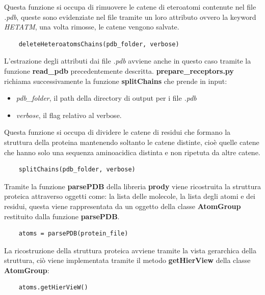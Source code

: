 Questa funzione si occupa di rimuovere le catene di eteroatomi contenute nel file \textit{.pdb}, queste sono evidenziate nel file tramite un loro attributo ovvero la keyword \textit{HETATM}, una volta rimosse, le catene vengono salvate. 

\begin{verbatim}
    deleteHeteroatomsChains(pdb_folder, verbose)
\end{verbatim}

L'estrazione degli attributi dai file \textit{.pdb} avviene anche in questo caso tramite la funzione \textbf{read\_pdb} precedentemente descritta.\newline
\textbf{prepare\_receptors.py} richiama successivamente la funzione \textbf{splitChains} che prende in input: 

\begin{itemize}
    \item \textit{pdb\_folder}, il path della directory di output per i file \textit{.pdb}
    \item \textit{verbose}, il flag relativo al verbose.
\end{itemize}

Questa funzione si occupa di dividere le catene di residui che formano la struttura della proteina mantenendo soltanto le catene distinte, cioè quelle catene che hanno solo una sequenza aminoacidica distinta e non ripetuta da altre catene. 

\begin{verbatim}
    splitChains(pdb_folder, verbose)    
\end{verbatim}

Tramite la funzione \textbf{parsePDB} della libreria \textbf{prody} viene ricostruita la struttura proteica attraverso oggetti come: la lista delle molecole, la lista degli atomi e dei residui, questa viene rappresentata da un oggetto della classe \textbf{AtomGroup} restituito dalla funzione \textbf{parsePDB}.

\begin{verbatim}
    atoms = parsePDB(protein_file)
\end{verbatim}

La ricostruzione della struttura proteica avviene tramite la vista gerarchica della struttura, ciò viene implementata tramite il metodo \textbf{getHierView} della classe \textbf{AtomGroup}:

\begin{verbatim}
    atoms.getHierVieW()
\end{verbatim}

